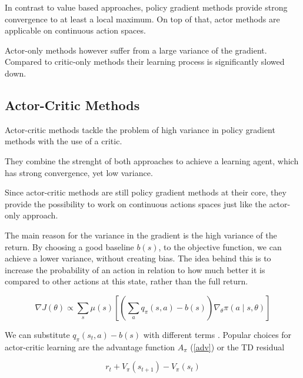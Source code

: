 In contrast to value based approaches, policy gradient methods provide strong convergence to at least a local maximum.
On top of that, actor methods are applicable on continuous action spaces.
 \citep{Sutton00policygradient}
 
Actor-only methods however suffer from a large variance of the gradient. Compared to critic-only methods their learning process is significantly slowed down. \citep{Grondman12}
 

\subsection{Actor-Critic Methods}

Actor-critic methods tackle the problem of high variance in policy gradient methods with the use of a critic.

They combine the strenght of both approaches to achieve a learning agent, which has strong convergence, yet low variance.

Since actor-critic methods are still policy gradient methods at their core, they provide the possibility to work on continuous actions spaces just like the actor-only approach.

The main reason for the variance in the gradient is the high variance of the return. By choosing a good baseline $ b(s)$, to the objective function, we can achieve a lower variance, without creating bias.
The idea behind this is to increase the probability of an action in relation to how much better it is compared to other actions at this state, rather than the full return.

\begin{equation}
\nabla J(\theta) \propto \sum_s \mu(s) \left[ \left( \sum_a q_\pi (s,a) -b(s)\right) \nabla_\theta \pi (a \mid s, \theta) \right]
\end{equation}

We can substitute $q_\pi(s_t,a) -b(s)$ with different terms \citep{Schulman15}.
Popular choices for actor-critic learning are the advantage function $A_\pi$ (\ref{adv}) or the TD residual 

\begin{equation}
r_t + V_\pi(s_{t+1}) - V_\pi(s_t)
\end{equation} 




